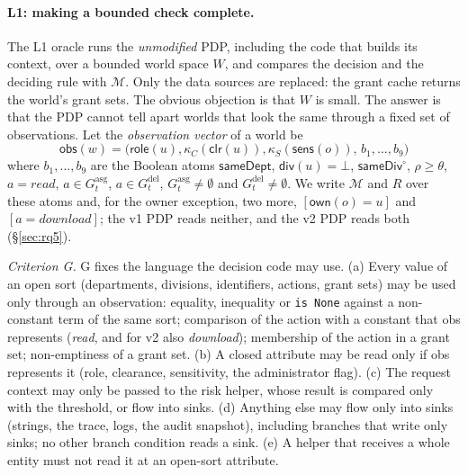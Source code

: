 \documentclass[sigconf,review,anonymous]{acmart}
\newcommand{\Gasg}{G^{\mathrm{asg}}}
\newcommand{\Gdel}{G^{\mathrm{del}}}
\newcommand{\sameDept}{\mathsf{sameDept}}
\newcommand{\sameDiv}{\mathsf{sameDiv}}
\newcommand{\role}{\mathsf{role}}
\newcommand{\obs}{\mathsf{obs}}
\begin{document}
\paragraph{L1: making a bounded check complete.} The L1 oracle runs the \emph{unmodified} PDP, including the
code that builds its context, over a bounded world space $W$, and compares the decision and the deciding rule
with $\mathcal{M}$. Only the data sources are replaced: the grant cache returns the world's grant sets. The
obvious objection is that $W$ is small. The answer is that the PDP cannot tell apart worlds that look the same
through a fixed set of observations. Let the \emph{observation vector} of a world be
\[
\obs(w)=\bigl(\role(u),\kappa_C(\mathsf{clr}(u)),\kappa_S(\mathsf{sens}(o)),\,b_1,\dots,b_9\bigr)
\]
where $b_1,\dots,b_9$ are the Boolean atoms $\sameDept$, $\mathsf{div}(u)=\bot$, $\sameDiv^\circ$,
$\rho\ge\theta$, $a=\mathit{read}$, $a\in\Gasg_t$, $a\in\Gdel_t$, $\Gasg_t\neq\emptyset$ and $\Gdel_t\neq\emptyset$.
We write $\mathcal{M}$ and $R$ over these atoms and, for the owner exception, two more,
$[\mathsf{own}(o)=u]$ and $[a=\mathit{download}]$; the v1 PDP reads neither, and the v2 PDP reads both
(\S\ref{sec:rq5}).

\emph{Criterion G.} G fixes the language the decision code may use. (a) Every value of an open sort
(departments, divisions, identifiers, actions, grant sets) may be used only through an observation: equality,
inequality or \texttt{is None} against a non-constant term of the same sort; comparison of the action with a
constant that obs represents (\emph{read}, and for v2 also \emph{download}); membership of the action in a grant set; non-emptiness of a
grant set. (b) A closed attribute may be read only if obs represents it (role, clearance, sensitivity, the
administrator flag). (c) The request context may only be passed to the risk helper, whose result is compared only
with the threshold, or flow into sinks. (d) Anything else may flow only into sinks (strings, the trace, logs, the
audit snapshot), including branches that write only sinks; no other branch condition reads a sink. (e) A helper
that receives a whole entity must not read it at an open-sort attribute.
\end{document}
